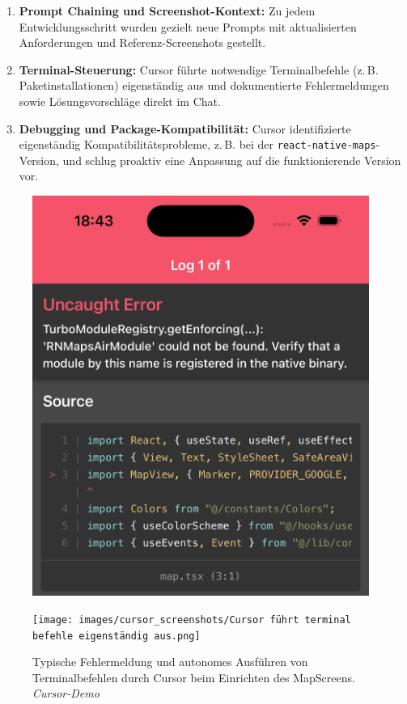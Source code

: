 \begin{enumerate}
      \item \textbf{Prompt Chaining und Screenshot-Kontext:} Zu jedem Entwicklungsschritt wurden gezielt neue Prompts mit aktualisierten Anforderungen und Referenz-Screenshots gestellt.
      \item \textbf{Terminal-Steuerung:} Cursor führte notwendige Terminalbefehle (z.\,B. Paketinstallationen) eigenständig aus und dokumentierte Fehlermeldungen sowie Lösungsvorschläge direkt im Chat.
      \item \textbf{Debugging und Package-Kompatibilität:} Cursor identifizierte eigenständig Kompatibilitätsprobleme, z.\,B. bei der \texttt{react-native-maps}-Version, und schlug proaktiv eine Anpassung auf die funktionierende Version vor.
\end{enumerate}

\begin{figure}[htbp]
      \centering
      \begin{minipage}{0.48\textwidth}
            \centering
            \includegraphics[width=0.98\textwidth]{images/cursor_screenshots/(NOBRIDGE) ERROR-cursor.png}
      \end{minipage}
      \hfill
      \begin{minipage}{0.48\textwidth}
            \centering
            \texttt{[image: images/cursor\_screenshots/Cursor führt terminal befehle eigenständig aus.png]}
      \end{minipage}
      \caption{Typische Fehlermeldung und autonomes Ausführen von Terminalbefehlen durch Cursor beim Einrichten des MapScreens. \textit{Cursor-Demo}}
      \label{fig:cursor-error-terminal}
\end{figure}

